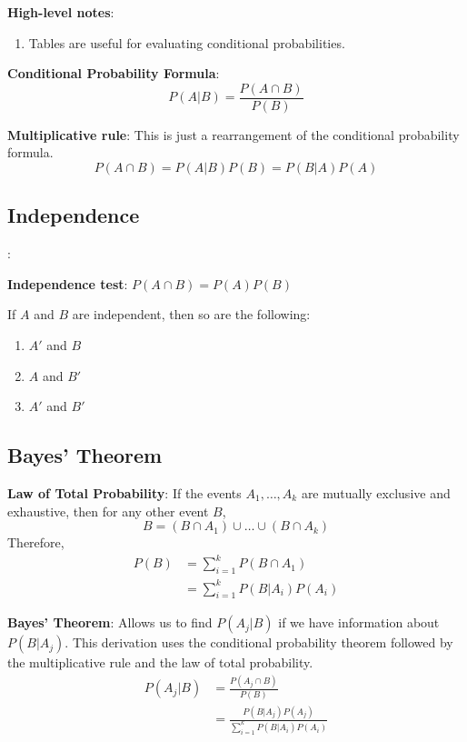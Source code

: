 \documentclass{article}
\begin{document}
\begin{multicols*}{2}
\textbf{High-level notes}:
\begin{enumerate}
    \item Tables are useful for evaluating conditional probabilities.
\end{enumerate}

\textbf{Conditional Probability Formula}:
\begin{equation*}
    P(A|B) = \frac{P(A \cap B)}{P(B)}
\end{equation*}

\textbf{Multiplicative rule}:
This is just a rearrangement of the conditional probability formula.
\begin{equation*}
    P(A \cap B) = P(A|B) P(B) = P(B|A) P(A)
\end{equation*}

\subsection{Independence}:

\textbf{Independence test}: $P(A \cap B) = P(A) P(B)$

If $A$ and $B$ are independent, then so are the following:
\begin{enumerate}
    \item $A'$ and $B$
    \item $A$ and $B'$
    \item $A'$ and $B'$
\end{enumerate}

\subsection{Bayes' Theorem}

\textbf{Law of Total Probability}: If the events $A_1, \ldots, A_k$ are mutually exclusive and exhaustive, then for any other event $B$,
\begin{equation*}
    B = (B \cap A_1) \cup \ldots \cup (B \cap A_k)
\end{equation*}
Therefore,
\begin{align*}
    P(B) &= \sum_{i = 1}^k P(B \cap A_1) \\
    &= \sum_{i = 1}^k P(B|A_i) P(A_i)
\end{align*}

\textbf{Bayes' Theorem}:
Allows us to find $P(A_j|B)$ if we have information about $P(B|A_j)$. This derivation uses the conditional probability theorem followed by the multiplicative rule and the law of total probability.
\begin{align*}
    P(A_j|B) &= \frac{P(A_j \cap B)}{P(B)} \\
    &= \frac{P(B|A_j) P(A_j)}{\sum_{i = 1}^k P(B|A_i) P(A_i)}
\end{align*}

\end{multicols*}
\end{document}
